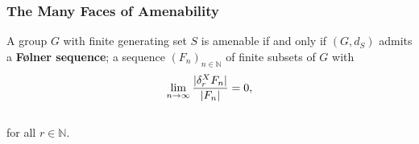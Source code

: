 \documentclass{beamer}
\DeclarePairedDelimiter{\abs}{\lvert}{\rvert}
\begin{document}

\begin{frame}
\frametitle{The Many Faces of Amenability}
\begin{theorem}
A group $G$ with finite generating set $S$ is amenable if and only if $(G, d_S)$ admits a \textbf{F{\o}lner sequence}; a sequence $(F_n)_{n \in \mathbb{N}}$ of finite subsets of $G$ with\\[-1.25\baselineskip]
\begin{align*}
\begin{split}
\lim_{n\to\infty}\frac{\abs{\delta_r^X F_n}}{\abs{F_n}} = 0,
\end{split}
\end{align*}
\noindent\\[-0.5\baselineskip] for all $r \in \mathbb{N}$.
\end{theorem}
\noindent\\[0.5\baselineskip]
\end{frame}
\end{document}
